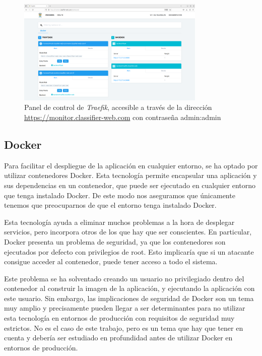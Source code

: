 \begin{figure}[H]
    \centering
    \includegraphics[width=0.8\textwidth]{cap3/images/monitor-dashboard.png}
    \caption{Panel de control de \textit{Traefik}, accesible a través de la dirección \url{https://monitor.classifier-web.com} con contraseña admin:admin}
    \label{fig:monitor-dashboard}
    
\end{figure}



\subsection{Docker}
Para facilitar el despliegue de la aplicación en cualquier entorno, se ha optado por utilizar contenedores Docker.
Esta tecnología permite encapsular una aplicación y sus dependencias en un contenedor, que puede ser ejecutado en cualquier entorno que tenga instalado Docker.
De este modo nos aseguramos que únicamente tenemos que preocuparnos de que el entorno tenga instalado Docker.

Esta tecnología ayuda a eliminar muchos problemas a la hora de desplegar servicios, pero incorpora otros de los que hay que ser conscientes.
En particular, Docker presenta un problema de seguridad, ya que los contenedores son ejecutados por defecto con privilegios de root.
Esto implicaría que si un atacante consigue acceder al contenedor, puede tener acceso a todo el sistema.

Este problema se ha solventado creando un usuario no privilegiado dentro del contenedor al construir la imagen de la aplicación, y ejecutando la aplicación con este usuario.
Sin embargo, las implicaciones de seguridad de Docker son un tema muy amplio y precisamente pueden llegar a ser determinantes para no utilizar esta tecnología en entornos de producción con requisitos de seguridad muy estrictos.
No es el caso de este trabajo, pero es un tema que hay que tener en cuenta y debería ser estudiado en profundidad antes de utilizar Docker en entornos de producción.


